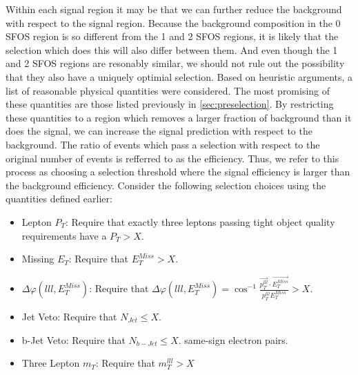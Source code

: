 Within each signal region it may be that we can further reduce the 
background with respect to the signal region. 
Because the background composition in the 0 SFOS region
is so different from the 1 and 2 SFOS regions, it is likely that
the selection which does this will also differ between them. 
And even though the
1 and 2 SFOS regions are resonably similar, we should not rule out
the possibility that they also have a uniquely optimial selection.
Based on heuristic arguments, a list of reasonable physical
quantities were considered. The most promising of these quantities
are those listed previously in \sec\ref{sec:preselection}. 
By restricting these quantities to a region which removes a larger
fraction of background than it does the signal, we can 
increase the signal prediction with respect to the background.
The ratio of events which pass a selection with respect
to the original number of events is refferred to as the 
efficiency.
Thus, we refer to this process 
as choosing a selection threshold where 
the signal efficiency is larger than the background efficiency.
Consider the following selection choices using the quantities defined
earlier:
\begin{itemize}
\item Lepton $P_{T}$:  Require that exactly three leptons passing tight object quality requirements have a $P_{T} > X$.
\item Missing $E_{T}$:  Require that $E_{T}^{Miss} > X$.
\item $\Delta\varphi(lll,E_{T}^{Miss})$:  Require that $\Delta\varphi(lll,E_{T}^{Miss}) = \cos^{-1}\frac{ \overrightarrow{p_{T}^{lll}}\cdot\overrightarrow{E_{T}^{Miss}} }{ p_{T}^{lll}E_{T}^{Miss} } > X$.
\item Jet Veto: Require that $N_{Jet} \leq X$.
\item b-Jet Veto: Require that $N_{b-Jet} \leq X$.
same-sign electron pairs.
\item Three Lepton $m_{T}$: Require that $m_{T}^{lll} > X$
\end{itemize}


